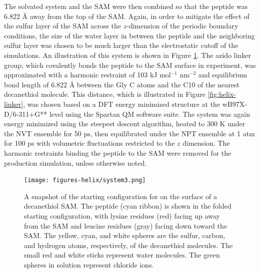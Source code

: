 The solvated system and the SAM were then combined so that the peptide was 6.822 \si{\angstrom} away from the top of the SAM. 
Again, in order to mitigate the effect of the sulfur layer of the SAM across the $z$-dimension of the periodic boundary conditions, the size of the water layer in between the peptide and the neighboring sulfur layer was chosen to be much larger than the electrostatic cutoff of the simulations. 
An illustration of this system is shown in Figure \ref{fig:helix-system}. 
The azido linker group, which covalently bonds the peptide to the SAM surface in experiment, was approximated with a harmonic restraint of 103 kJ mol$^{-1}$ nm$^{-2}$ and equilibrium bond length of 6.822 \si{\angstrom} between the Gly C\textalpha{} atoms and the C10 of the nearest decanethiol molecule. 
This distance, which is illustrated in Figure \ref{fig:helix-linker}, was chosen based on a DFT energy minimized structure at the wB97X-D/6-311$+$G** level using the Spartan QM software suite\cite{Shao2006}.   
The system was again energy minimized using the steepest descent algorithm, heated to 300 K under the NVT ensemble for 50 ps, then equilibrated under the NPT ensemble at 1 atm for 100 ps with volumetric fluctuations restricted to the $z$ dimension. 
The harmonic restraints binding the peptide to the SAM were removed for the production simulation, unless otherwise noted.

\begin{figure}
    \center
    \texttt{[image: figures-helix/system3.png]}
    \caption{A snapshot of the starting configuration for \pep{} on the surface of a decanethiol SAM. The peptide (cyan ribbon) is shown in the folded starting configuration, with lysine residues (red) facing up away from the SAM and leucine residues (gray) facing down toward the SAM. The yellow, cyan, and white spheres are the sulfur, carbon, and hydrogen atoms, respectively, of the decanethiol molecules. The small red and white sticks represent water molecules. The green spheres in solution represent chloride ions. }
    \label{fig:helix-system}
\end{figure}

